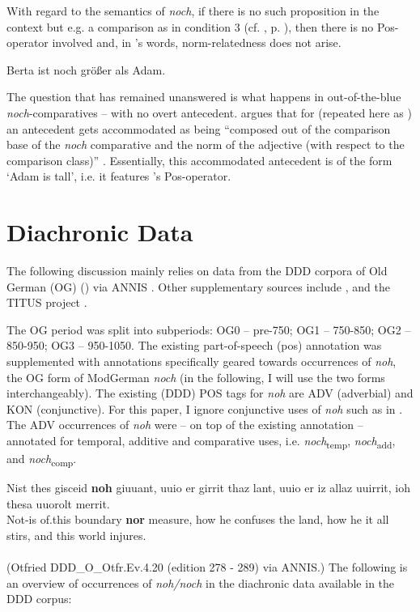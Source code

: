 \documentclass[output=paper,
modfonts
]{langscibook}
\begin{document}
With regard to the semantics of \textit{noch}, if there is no such proposition in the context but e.g. a comparison as in condition 3 (cf. , p. \pageref{tab:4_conds}), then there is no Pos-operator involved \citep[62]{stechow1984} and, in \citeauthor{umbach2009a_comp}'s words, norm-relatedness does not arise. 

\ea Berta ist noch größer als Adam. \label{B_noch_>_Adam_repeat}\z

The question that has remained unanswered is what happens in out-of-the-blue \textit{noch}-comparatives -- with no overt antecedent. \citeauthor{umbach2009a_comp} argues that for  (repeated here as ) an antecedent gets accommodated as being ``composed out of the comparison base of the \textit{noch} comparative and the norm of the adjective (with respect to the comparison class)'' \citep[10]{umbach2009a_comp}. Essentially, this accommodated antecedent is of the form `Adam is tall', i.e. it features \citeauthor{stechow2006}'s \citeyearpar{stechow2006} Pos-operator. 


\section{Diachronic Data}\label{sec_diachronic_data}


The following discussion mainly relies on data from the DDD corpora of Old German (OG) (\citeauthor{ddd_OG}) via ANNIS \citep{annis_og}. Other supplementary sources include \citep{kali}, and the TITUS project \citep{titus}.

The OG period was split into subperiods: OG0 -- pre-750; OG1 -- 750-850; OG2 -- 850-950; OG3 -- 950-1050. The existing part-of-speech (pos) annotation was supplemented with annotations specifically geared towards occurrences of \textit{noh}, the OG form of ModGerman \textit{noch} (in the following, I will use the two forms interchangeably). The existing (DDD) POS tags for \textit{noh} are ADV (adverbial) and KON (conjunctive). For this paper, I ignore conjunctive uses of \textit{noh} such as in . The ADV occurrences of \textit{noh} were -- on top of the existing annotation -- annotated for temporal, additive and comparative uses, i.e. \textit{noch}\textsubscript{temp}, \textit{noch}\textsubscript{add}, and \textit{noch}\textsubscript{comp}.


\ea\gll Nist thes gisceid \textbf{noh} giuuant, uuio er girrit thaz lant, uuio er iz allaz uuirrit, ioh thesa uuorolt merrit.\label{KON_noch}\\
       Not-is of.this boundary \textbf{nor} measure, how he confuses the land, how he it all stirs, and this world injures.\\
 \\ (Otfried DDD\_O\_Otfr.Ev.4.20 (edition 278 - 289) via ANNIS.) %
\z
The following is an overview of occurrences of \textit{noh\slash noch} in the diachronic data available in the DDD corpus:
\end{document}

